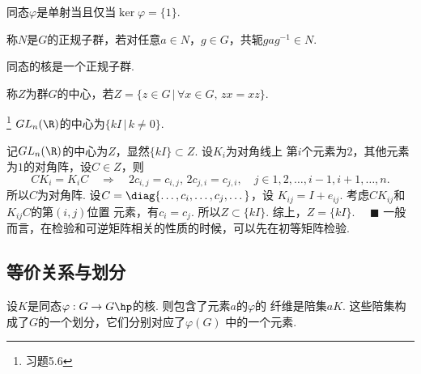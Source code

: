   \begin{cor}[单射]
    同态$\varphi$是单射当且仅当$\ker\varphi = \{1\}$.
  \end{cor}

  \begin{defi}[正规子群]
    称$N$是$G$的正规子群，若对任意$a\in N$，$g\in G$，共轭$gag^{-1}\in N$.
  \end{defi}

  \begin{thm}
    同态的核是一个正规子群.
  \end{thm}

  \begin{defi}[中心]
    称$Z$为群$G$的中心，若$Z=\{z\in G\,|\, \forall x\in G,\,zx=xz\}$.
  \end{defi}

  \begin{pos}
    \footnote{习题5.6}
    $GL_n(\R)$的中心为$\{kI\,|\,k\ne 0\}$.
  \end{pos}
  \proof
    记$GL_n(\R)$的中心为$Z$，显然$\{kI\}\subset Z$. 设$K_i$为对角线上
    第$i$个元素为$2$，其他元素为$1$的对角阵，设$C\in Z$，则
    \[
      CK_i = K_iC \quad\Rightarrow\quad
      2c_{i, j} = c_{i, j},\,2c_{j, i} = c_{j, i},
      \quad j\in{1,2,\dots,i-1,i+1,\dots,n}.
    \]
    所以$C$为对角阵. 设$C=\diag{\dots,c_i,\dots,c_j,\dots}$，设
    $K_{ij} = I+e_{ij}$. 考虑$CK_{ij}$和$K_{ij}C$的第$(i,j)$位置
    元素，有$c_i=c_j$. 所以$Z\subset\{kI\}$. 综上，$Z=\{kI\}$.
    $\quad\blacksquare$
  \remark
    一般而言，在检验和可逆矩阵相关的性质的时候，可以先在初等矩阵检验.


\subsection{等价关系与划分}

  \begin{pos}[核的陪集]
    设$K$是同态$\varphi:G\to G\hp$的核. 则包含了元素$a$的$\varphi$的
    纤维是陪集$aK$. 这些陪集构成了$G$的一个划分，它们分别对应了$\varphi(G)$
    中的一个元素.
  \end{pos}



